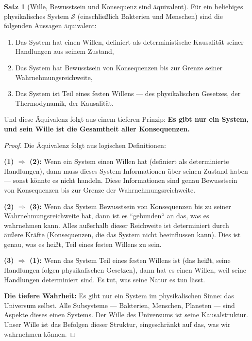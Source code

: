 \documentclass[a4paper,12pt]{article}
\theoremstyle{definition}
\newtheorem{satz}{Satz}
\begin{document}
\begin{satz}[Wille, Bewusstsein und Konsequenz sind äquivalent]
\label{satz:wille_als_konsequenz}
Für ein beliebiges physikalisches System $\mathcal{S}$ (einschließlich Bakterien und Menschen) sind die folgenden Aussagen äquivalent:

\begin{enumerate}
    \item Das System hat einen Willen, definiert als deterministische Kausalität seiner Handlungen aus seinem Zustand,
    
    \item Das System hat Bewusstsein von Konsequenzen bis zur Grenze seiner Wahrnehmungsreichweite,
    
    \item Das System ist Teil eines festen Willens --- des physikalischen Gesetzes, der Thermodynamik, der Kausalität.
\end{enumerate}

Und diese Äquivalenz folgt aus einem tieferen Prinzip: \textbf{Es gibt nur ein System, und sein Wille ist die Gesamtheit aller Konsequenzen.}
\end{satz}

\begin{proof}
Die Äquivalenz folgt aus logischen Definitionen:

\textbf{(1) $\Rightarrow$ (2):} Wenn ein System einen Willen hat (definiert als determinierte Handlungen), dann muss dieses System Informationen über seinen Zustand haben --- sonst könnte es nicht handeln. Diese Informationen sind genau Bewusstsein von Konsequenzen bis zur Grenze der Wahrnehmungsreichweite.

\textbf{(2) $\Rightarrow$ (3):} Wenn das System Bewusstsein von Konsequenzen bis zu seiner Wahrnehmungsreichweite hat, dann ist es ``gebunden`` an das, was es wahrnehmen kann. Alles außerhalb dieser Reichweite ist determiniert durch äußere Kräfte (Konsequenzen, die das System nicht beeinflussen kann). Dies ist genau, was es heißt, Teil eines festen Willens zu sein.

\textbf{(3) $\Rightarrow$ (1):} Wenn das System Teil eines festen Willens ist (das heißt, seine Handlungen folgen physikalischen Gesetzen), dann hat es einen Willen, weil seine Handlungen determiniert sind. Es tut, was seine Natur es tun lässt.

\textbf{Die tiefere Wahrheit:} Es gibt nur ein  System im physikalischen Sinne: das Universum selbst. Alle Subsysteme --- Bakterien, Menschen, Planeten --- sind Aspekte dieses einen Systems. Der Wille des Universums ist seine Kausalstruktur. Unser Wille ist das Befolgen dieser Struktur, eingeschränkt auf das, was wir wahrnehmen können.
\end{proof}
\end{document}
